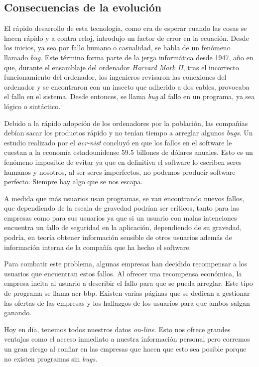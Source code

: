 \documentclass[twoside, titlepage, 12pt, a4paper]{article}
\begin{document}
\subsection{Consecuencias de la evolución}
El rápido desarrollo de esta tecnología, como era de esperar cuando las cosas se hacen rápido y a contra reloj, introdujo un factor de error en la ecuación. Desde los inicios, ya sea por fallo humano o casualidad, se habla de un fenómeno llamado \textit{\gls{bug}}. Este término forma parte de la jerga informática desde 1947, año en que, durante el ensamblaje del ordenador \textit{Harvard Mark II}, tras el incorrecto funcionamiento del ordenador, los ingenieros revisaron las conexiones del ordenador y se encontraron con un insecto que adherido a dos cables, provocaba el fallo en el sistema. Desde entonces, se llama \textit{\gls{bug}} al fallo en un programa, ya sea lógico o sintáctico.\par
Debido a la rápido adopción de los ordenadores por la población, las compañías debían sacar los productos rápido y no tenían tiempo a arreglar algunos \textit{\gls{bug}s}. Un estudio realizado por el \textit{\gls{acr-nist}} concluyó en que los fallos en el software le cuestan a la economía estadounidense 59.5 billones de dólares anuales.\cite{NIST} Esto es un fenómeno imposible de evitar ya que en definitiva el software lo escriben seres humanos y nosotros, al ser seres imperfectos, no podemos producir software perfecto. Siempre hay algo que se nos escapa.\par
A medida que más usuarios usan programas, se van encontrando nuevos fallos, que dependiendo de la escala de gravedad podrían ser críticos, tanto para las empresas como para sus usuarios ya que si un usuario con malas intenciones encuentra un fallo de seguridad en la aplicación, dependiendo de su gravedad, podría, en teoría obtener información sensible de otros usuarios además de información interna de la compañía que ha hecho el software.\par
Para combatir este problema, algunas empresas han decidido recompensar a los usuarios que encuentran estos fallos. Al ofrecer una recompensa económica, la empresa incita al usuario a describir el fallo para que se pueda arreglar. Este tipo de programa se llama \gls{acr-bbp}. Existen varias páginas que se dedican a gestionar las ofertas de las empresas y los hallazgos de los usuarios para que ambos salgan ganando.\par
Hoy en día, tenemos todos nuestros datos \textit{on-line}. Esto nos ofrece grandes ventajas como el acceso inmediato a nuestra información personal pero corremos un gran riesgo al confiar en las empresas que hacen que esto sea posible porque no existen programas sin  \textit{\gls{bug}s}.
\end{document}
